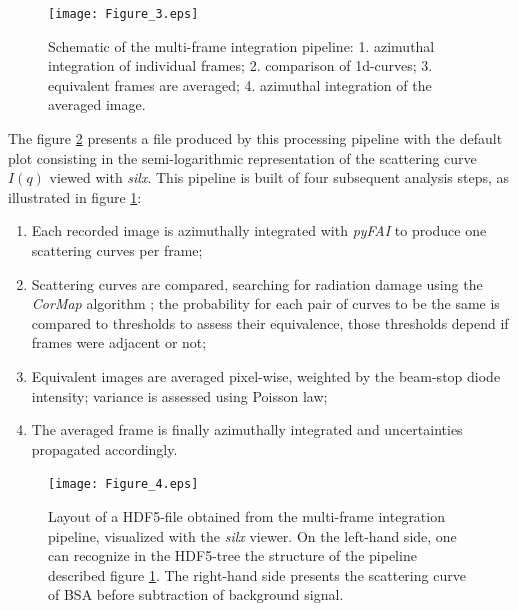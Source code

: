 \documentclass[preprint]{iucr}              %
\begin{document}
\begin{figure}
     \label{multiframe_worflow}
     \begin{center} 
     \caption{Schematic of the multi-frame integration pipeline: 
     1. azimuthal integration of individual frames; 
     2. comparison of 1d-curves;
     3. equivalent frames are averaged;
     4. azimuthal integration of the averaged image.}
     \texttt{[image: Figure\_3.eps]}
     \end{center}
\end{figure}

The figure \ref{multiframe} presents a file produced by this processing pipeline with the default plot consisting in the semi-logarithmic representation of the scattering curve $I(q)$ viewed with \textit{silx}.
This pipeline is built of four subsequent analysis steps, as illustrated in figure \ref{multiframe_worflow}:
\begin{enumerate}
\item Each recorded image is azimuthally integrated with \textit{pyFAI} \cite{pyfai_2020} to produce one scattering curves per frame;
\item Scattering curves are compared, searching for radiation damage using the \textit{CorMap} algorithm \cite{CorMap}; the probability for each pair of curves to be the same is compared to thresholds to assess their equivalence, those thresholds depend if frames were adjacent or not;
\item Equivalent images are averaged pixel-wise, weighted by the beam-stop diode intensity; variance is assessed using Poisson law;
\item The averaged frame is finally azimuthally integrated and uncertainties propagated accordingly. 
\end{enumerate}

\begin{figure}
     \caption{Layout of a HDF5-file obtained from the multi-frame integration pipeline, visualized with the \textit{silx} viewer.
     On the left-hand side, one can recognize in the HDF5-tree the structure of the pipeline described figure \ref{multiframe_worflow}.
     The right-hand side presents the scattering curve of BSA before subtraction of background signal.}
     \texttt{[image: Figure\_4.eps]}
     \label{multiframe}
\end{figure}
\end{document}
